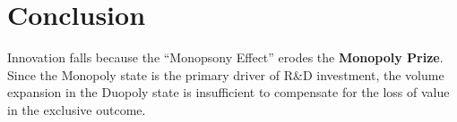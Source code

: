 \documentclass[12pt]{article}
\begin{document}
\newpage

\section{Conclusion}
Innovation falls because the ``Monopsony Effect'' erodes the \textbf{Monopoly Prize}. Since the Monopoly state is the primary driver of R\&D investment, the volume expansion in the Duopoly state is insufficient to compensate for the loss of value in the exclusive outcome.
\end{document}
